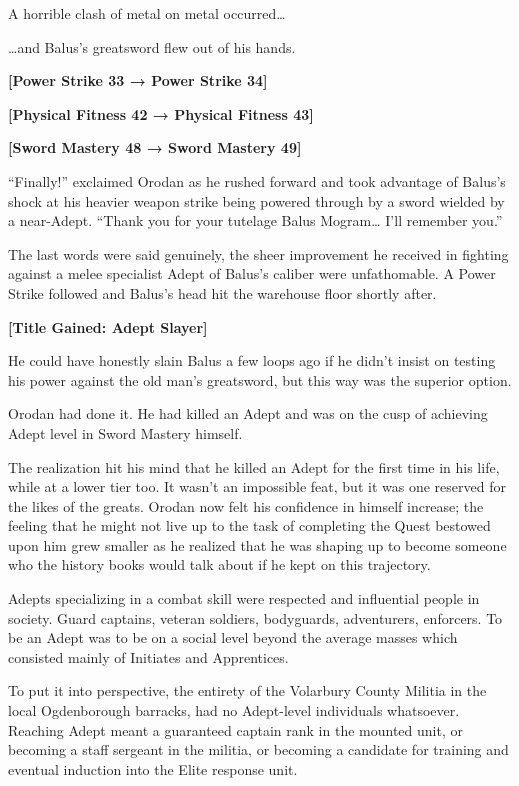 \documentclass[a4paper,10pt]{book}
\begin{document}
A horrible clash of metal on metal occurred…\par
…and Balus’s greatsword flew out of his hands.\par
\textbf{[Power Strike 33 → Power Strike 34]}\par
\textbf{[Physical Fitness 42 → Physical Fitness 43]}\par
\textbf{[Sword Mastery 48 → Sword Mastery 49]}\par
“Finally!” exclaimed Orodan as he rushed forward and took advantage of Balus’s shock at his heavier weapon strike being powered through by a sword wielded by a near-Adept. “Thank you for your tutelage Balus Mogram… I’ll remember you.”\par
The last words were said genuinely, the sheer improvement he received in fighting against a melee specialist Adept of Balus’s caliber were unfathomable. A Power Strike followed and Balus’s head hit the warehouse floor shortly after.\par
\textbf{[Title Gained: Adept Slayer]}\par
He could have honestly slain Balus a few loops ago if he didn’t insist on testing his power against the old man’s greatsword, but this way was the superior option.\par
Orodan had done it. He had killed an Adept and was on the cusp of achieving Adept level in Sword Mastery himself.\par
The realization hit his mind that he killed an Adept for the first time in his life, while at a lower tier too. It wasn’t an impossible feat, but it was one reserved for the likes of the greats. Orodan now felt his confidence in himself increase; the feeling that he might not live up to the task of completing the Quest bestowed upon him grew smaller as he realized that he was shaping up to become someone who the history books would talk about if he kept on this trajectory.\par
Adepts specializing in a combat skill were respected and influential people in society. Guard captains, veteran soldiers, bodyguards, adventurers, enforcers. To be an Adept was to be on a social level beyond the average masses which consisted mainly of Initiates and Apprentices.\par
To put it into perspective, the entirety of the Volarbury County Militia in the local Ogdenborough barracks, had no Adept-level individuals whatsoever. Reaching Adept meant a guaranteed captain rank in the mounted unit, or becoming a staff sergeant in the militia, or becoming a candidate for training and eventual induction into the Elite response unit.\par
\end{document}
